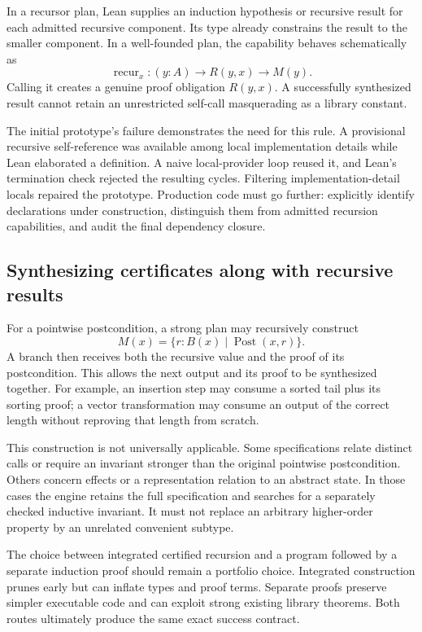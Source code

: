 \documentclass[11pt,letterpaper]{article}
\theoremstyle{definition}
\theoremstyle{remark}
\begin{document}
In a recursor plan, Lean supplies an induction hypothesis or recursive result for each admitted recursive component. Its type already constrains the result to the smaller component. In a well-founded plan, the capability behaves schematically as
\[
 \operatorname{recur}_x:(y:A)\to R(y,x)\to M(y).
\]
Calling it creates a genuine proof obligation $R(y,x)$. A successfully synthesized result cannot retain an unrestricted self-call masquerading as a library constant.

The initial prototype's failure demonstrates the need for this rule. A provisional recursive self-reference was available among local implementation details while Lean elaborated a definition. A naive local-provider loop reused it, and Lean's termination check rejected the resulting cycles. Filtering implementation-detail locals repaired the prototype. Production code must go further: explicitly identify declarations under construction, distinguish them from admitted recursion capabilities, and audit the final dependency closure.

\subsection{Synthesizing certificates along with recursive results}

For a pointwise postcondition, a strong plan may recursively construct
\[
 M(x)=\{r:B(x)\mid\operatorname{Post}(x,r)\}.
\]
A branch then receives both the recursive value and the proof of its postcondition. This allows the next output and its proof to be synthesized together. For example, an insertion step may consume a sorted tail plus its sorting proof; a vector transformation may consume an output of the correct length without reproving that length from scratch.

This construction is not universally applicable. Some specifications relate distinct calls or require an invariant stronger than the original pointwise postcondition. Others concern effects or a representation relation to an abstract state. In those cases the engine retains the full specification and searches for a separately checked inductive invariant. It must not replace an arbitrary higher-order property by an unrelated convenient subtype.

The choice between integrated certified recursion and a program followed by a separate induction proof should remain a portfolio choice. Integrated construction prunes early but can inflate types and proof terms. Separate proofs preserve simpler executable code and can exploit strong existing library theorems. Both routes ultimately produce the same exact success contract.
\end{document}
